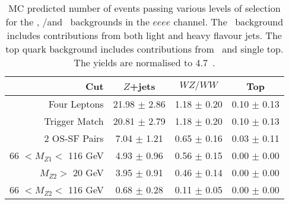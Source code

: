 \begin{table}[htbp]
  \centering
  \begin{tabular}{r|c|c|c} 
    \hline\hline
                 Cut &               $Z$+jets &             $WZ/WW$ &               Top\\ 
    \hline
        Four Leptons &  21.98 $\pm$ 2.86 & 1.18 $\pm$ 0.20 & 0.10 $\pm$ 0.13 \\ 
       Trigger Match &  20.81 $\pm$ 2.79 & 1.18 $\pm$ 0.20 & 0.10 $\pm$ 0.13 \\ 
       2 OS-SF Pairs &  7.04 $\pm$ 1.21 & 0.65 $\pm$ 0.16 & 0.03 $\pm$ 0.11 \\ 
66 $ < M_{Z1} < $ 116 GeV &  4.93 $\pm$ 0.96 & 0.56 $\pm$ 0.15 & 0.00 $\pm$ 0.00 \\ 
  $M_{Z2} > $ 20 GeV &  3.95 $\pm$ 0.91 & 0.46 $\pm$ 0.14 & 0.00 $\pm$ 0.00 \\ 
66 $ < M_{Z2} < $ 116 GeV &  0.68 $\pm$ 0.28 & 0.11 $\pm$ 0.05 & 0.00 $\pm$ 0.00 \\ 
    \hline\hline
  \end{tabular}
  \caption[MC predicted number of events passing various levels of selection for
  the \Zjets, \WZ/\WW and \topquark\ backgrounds in the $eeee$ channel.]
  {MC predicted number of events passing various levels of selection for
  the \Zjets, \WZ/\WW and \topquark\ backgrounds in the $eeee$ channel. The
  \Zjets\ background includes contributions from both light and heavy flavour
  jets. The top quark background includes contributions from \ttbar\ and
  single top. The yields are normalised to 4.7~\ifb.
  }
  \label{table:mc-bg-2e2mu}
\end{table}

